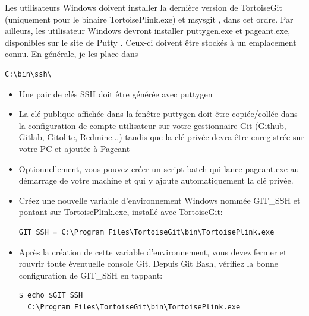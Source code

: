 \documentclass{../../common/tufte-latex/tufte-handout}
\begin{document}
Les utilisateurs Windows doivent installer la dernière version de TortoiseGit  (uniquement pour le binaire TortoisePlink.exe) et msysgit , dans cet ordre.
Par ailleurs, les utilisateur Windows devront installer puttygen.exe et pageant.exe, disponibles sur le site de Putty . Ceux-ci doivent être stockés à un emplacement connu. En générale, je les place dans 

\begin{lstlisting}[style=BashInputStyle]
  C:\bin\ssh\
\end{lstlisting}

\begin{itemize}

\item{Une pair de clés SSH doit être générée avec puttygen}
\item{La clé publique affichée dans la fenêtre puttygen doit être copiée/collée dans la configuration de compte utilisateur sur votre gestionnaire Git (Github, Gitlab, Gitolite, Redmine...) tandis que la clé privée devra être enregistrée sur votre PC et ajoutée à Pageant} 
\item{Optionnellement, vous pouvez créer un script batch qui lance pageant.exe au démarrage de votre machine et qui y ajoute automatiquement la clé privée.}
\item{Créez une nouvelle variable d'environnement Windows nommée GIT\_SSH et pontant sur TortoisePlink.exe, installé avec TortoiseGit:}
\begin{lstlisting}[style=BashInputStyle]
  GIT_SSH = C:\Program Files\TortoiseGit\bin\TortoisePlink.exe
\end{lstlisting}
\item{Après la création de cette variable d'environnement, vous devez fermer et rouvrir toute éventuelle console Git. Depuis Git Bash, vérifiez la bonne configuration de GIT\_SSH en tappant:}

\begin{lstlisting}[style=BashInputStyle]
  $ echo $GIT_SSH
  C:\Program Files\TortoiseGit\bin\TortoisePlink.exe
\end{lstlisting}

\end{itemize}
\end{document}
